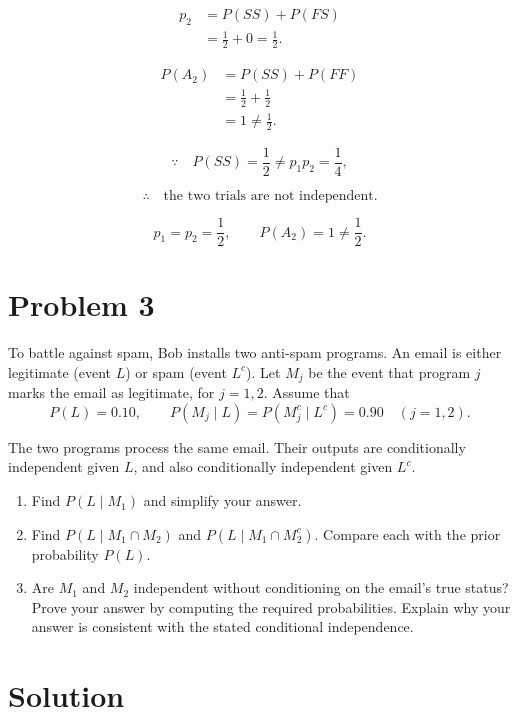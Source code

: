 \documentclass[11pt,a4paper]{article}
\begin{document}
\[
\begin{aligned}
p_2
&=P(SS)+P(FS)\\
&=\frac12+0=\frac12.
\end{aligned}
\]

\[
\begin{aligned}
P(A_2)
&=P(SS)+P(FF)\\
&=\frac12+\frac12\\
&=1\neq\frac12.
\end{aligned}
\]

\[
\because\quad
P(SS)=\frac12
\neq p_1p_2=\frac14,
\]

\[
\therefore\quad
\text{the two trials are not independent}.
\]

\[
p_1=p_2=\frac12,
\qquad
P(A_2)=1\neq\frac12.
\]



\section*{Problem 3}

To battle against spam, Bob installs two anti-spam programs.
An email is either legitimate (event $L$) or spam (event $L^c$).
Let $M_j$ be the event that program $j$ marks the email as
legitimate, for $j=1,2$. Assume that
\[
P(L)=0.10,\qquad
P(M_j\mid L)=P(M_j^c\mid L^c)=0.90
\quad (j=1,2).
\]

The two programs process the same email.
Their outputs are conditionally independent given $L$,
and also conditionally independent given $L^c$.

\begin{enumerate}[label=(\alph*)]

\item Find $P(L\mid M_1)$ and simplify your answer.

\item Find $P(L\mid M_1\cap M_2)$ and
$P(L\mid M_1\cap M_2^c)$.
Compare each with the prior probability $P(L)$.

\item Are $M_1$ and $M_2$ independent without
conditioning on the email's true status?
Prove your answer by computing the required probabilities.
Explain why your answer is consistent with the stated
conditional independence.

\end{enumerate}

\section*{Solution}
\end{document}
